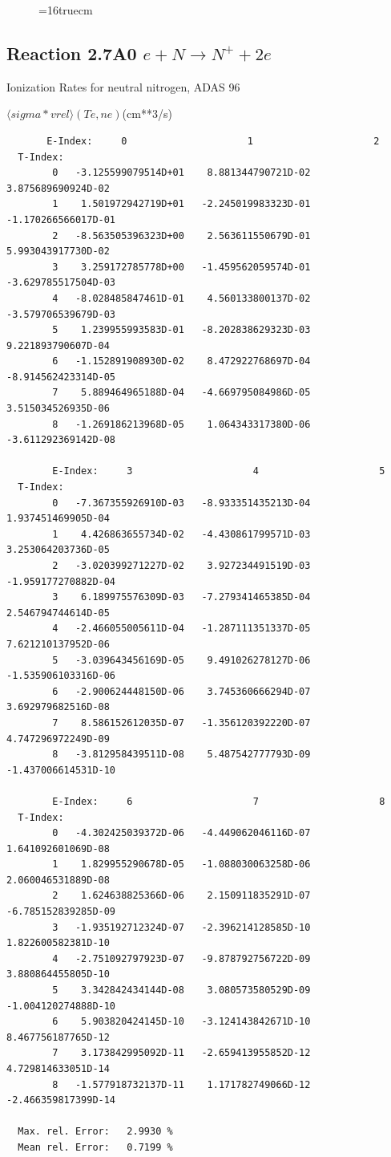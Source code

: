 \documentclass[12pt,dvips]{article}
\begin{document}
\begin{figure} \label{2.6A0}
\epsfxsize=16truecm
\end{figure}
\newpage

\subsection{
Reaction 2.7A0 $e + N \rightarrow N^+  + 2e $ }
  Ionization Rates for neutral  nitrogen,   ADAS 96

$  \langle sigma*vrel \rangle(Te,ne) $(cm**3/s)
\begin{small}\begin{verbatim}
       E-Index:     0                     1                     2
  T-Index:
        0   -3.125599079514D+01    8.881344790721D-02    3.875689690924D-02
        1    1.501972942719D+01   -2.245019983323D-01   -1.170266566017D-01
        2   -8.563505396323D+00    2.563611550679D-01    5.993043917730D-02
        3    3.259172785778D+00   -1.459562059574D-01   -3.629785517504D-03
        4   -8.028485847461D-01    4.560133800137D-02   -3.579706539679D-03
        5    1.239955993583D-01   -8.202838629323D-03    9.221893790607D-04
        6   -1.152891908930D-02    8.472922768697D-04   -8.914562423314D-05
        7    5.889464965188D-04   -4.669795084986D-05    3.515034526935D-06
        8   -1.269186213968D-05    1.064343317380D-06   -3.611292369142D-08

        E-Index:     3                     4                     5
  T-Index:
        0   -7.367355926910D-03   -8.933351435213D-04    1.937451469905D-04
        1    4.426863655734D-02   -4.430861799571D-03    3.253064203736D-05
        2   -3.020399271227D-02    3.927234491519D-03   -1.959177270882D-04
        3    6.189975576309D-03   -7.279341465385D-04    2.546794744614D-05
        4   -2.466055005611D-04   -1.287111351337D-05    7.621210137952D-06
        5   -3.039643456169D-05    9.491026278127D-06   -1.535906103316D-06
        6   -2.900624448150D-06    3.745360666294D-07    3.692979682516D-08
        7    8.586152612035D-07   -1.356120392220D-07    4.747296972249D-09
        8   -3.812958439511D-08    5.487542777793D-09   -1.437006614531D-10

        E-Index:     6                     7                     8
  T-Index:
        0   -4.302425039372D-06   -4.449062046116D-07    1.641092601069D-08
        1    1.829955290678D-05   -1.088030063258D-06    2.060046531889D-08
        2    1.624638825366D-06    2.150911835291D-07   -6.785152839285D-09
        3   -1.935192712324D-07   -2.396214128585D-10    1.822600582381D-10
        4   -2.751092797923D-07   -9.878792756722D-09    3.880864455805D-10
        5    3.342842434144D-08    3.080573580529D-09   -1.004120274888D-10
        6    5.903820424145D-10   -3.124143842671D-10    8.467756187765D-12
        7    3.173842995092D-11   -2.659413955852D-12    4.729814633051D-14
        8   -1.577918732137D-11    1.171782749066D-12   -2.466359817399D-14

  Max. rel. Error:   2.9930 %
  Mean rel. Error:   0.7199 %


\end{verbatim}\end{small}
\end{document}
